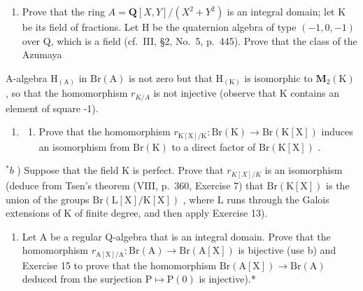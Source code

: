 \begin{enumerate}
\def\labelenumi{\alph{enumi})}
\setcounter{enumi}{1}
\tightlist
\item
  Prove that the ring \(A = \mathbf{Q}[X, Y]/(X^{2} + Y^{2})\) is an integral domain; let K be its field of fractions. Let H be the quaternion algebra of type \((-1, 0, -1)\) over Q, which is a field (cf.~III, §2, No.~5, p.~445). Prove that the class of the Azumaya
\end{enumerate}

A-algebra \(\mathrm{H}_{(\mathrm{A})}\) in \(\mathrm{Br}(\mathrm{A})\) is not zero but that \(\mathrm{H}_{(\mathrm{K})}\) is isomorphic to \(\mathbf{M}_{2}(\mathrm{K})\) , so that the homomorphism \(r_{K/A}\) is not injective (observe that K contains an element of square -1).

\begin{enumerate}
\def\labelenumi{\arabic{enumi})}
\setcounter{enumi}{15}
\tightlist
\item
  \begin{enumerate}
  \def\labelenumii{\alph{enumii})}
  \tightlist
  \item
    Prove that the homomorphism \(r_{\mathrm{K[X]}/\mathrm{K}} : \mathrm{Br}(\mathrm{K}) \to \mathrm{Br}(\mathrm{K}[\mathrm{X}])\) induces an isomorphism from \(\mathrm{Br}(\mathrm{K})\) to a direct factor of \(\mathrm{Br}(\mathrm{K}[\mathrm{X}])\) .
  \end{enumerate}
\end{enumerate}

\(^{*}b\) ) Suppose that the field K is perfect. Prove that \(r_{K[X]/K}\) is an isomorphism (deduce from Tsen's theorem (VIII, p.~360, Exercise 7) that \(\mathrm{Br}(\mathrm{K}[\mathrm{X}])\) is the union of the groups \(\mathrm{Br}(\mathrm{L}[\mathrm{X}]/\mathrm{K}[\mathrm{X}])\) , where L runs through the Galois extensions of K of finite degree, and then apply Exercise 13).

\begin{enumerate}
\def\labelenumi{\alph{enumi})}
\setcounter{enumi}{2}
\tightlist
\item
  Let A be a regular Q-algebra that is an integral domain. Prove that the homomorphism \(r_{\mathrm{A[X]}/\mathrm{A}} : \mathrm{Br}(\mathrm{A}) \to \mathrm{Br}(\mathrm{A}[\mathrm{X}])\) is bijective (use b) and Exercise 15 to prove that the homomorphism \(\mathrm{Br}(\mathrm{A}[\mathrm{X}]) \to \mathrm{Br}(\mathrm{A})\) deduced from the surjection \(\mathrm{P} \mapsto \mathrm{P}(0)\) is injective).*
\end{enumerate}

